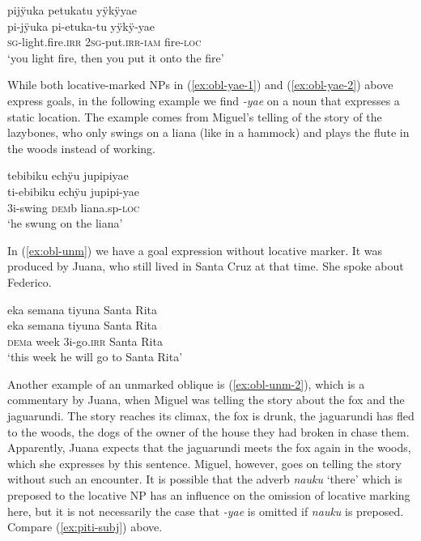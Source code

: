 \ea\label{ex:obl-yae-2}
\begingl
\glpreamble pijÿuka petukatu yÿkÿyae\\
\gla pi-jÿuka pi-etuka-tu yÿkÿ-yae\\
\textsc{sg}-light.fire.\textsc{irr} 2\textsc{sg}-put.\textsc{irr}-\textsc{iam} fire-\textsc{loc}\\
\glft ‘you light fire, then you put it onto the fire’
\endgl
\trailingcitation{[jmx-d110918ls-1.009]}
\xe

While both locative-marked NPs in (\ref{ex:obl-yae-1}) and (\ref{ex:obl-yae-2}) above express goals, in the following example we find \textit{-yae} on a noun that expresses a static location. The example comes from Miguel’s telling of the story of the lazybones, who only swings on a liana (like in a hammock) and plays the flute in the woods instead of working.

\ea\label{ex:obl-yae-3}
\begingl
\glpreamble tebibiku echÿu jupipiyae\\
\gla ti-ebibiku echÿu jupipi-yae\\
\glb 3i-swing \textsc{dem}b liana.sp-\textsc{loc}\\
\glft ‘he swung on the liana’
\endgl
\trailingcitation{[mox-n110920l.067]}
\xe

In (\ref{ex:obl-unm}) we have a goal expression without locative marker. It was produced by Juana, who still lived in Santa Cruz at that time. She spoke about Federico.

\ea\label{ex:obl-unm}
\begingl
\glpreamble eka semana tiyuna Santa Rita\\
\gla eka semana tiyuna {Santa Rita}\\
\glb \textsc{dem}a week 3i-go.\textsc{irr} {Santa Rita}\\
\glft ‘this week he will go to Santa Rita’
\endgl
\trailingcitation{[jxx-p110923l-1.098]}
\xe

Another example of an unmarked oblique is (\ref{ex:obl-unm-2}), which is a commentary by Juana, when Miguel was telling the story about the fox and the jaguarundi. The story reaches its climax, the fox is drunk, the jaguarundi has fled to the woods, the dogs of the owner of the house they had broken in chase them. Apparently, Juana expects that the jaguarundi meets the fox again in the woods, which she expresses by this sentence. Miguel, however, goes on telling the story without such an encounter. It is possible that the adverb \textit{nauku} ‘there’ which is preposed to the locative NP has an influence on the omission of locative marking here, but it is not necessarily the case that \textit{-yae} is omitted if \textit{nauku} is preposed. Compare (\ref{ex:piti-subj}) above.

